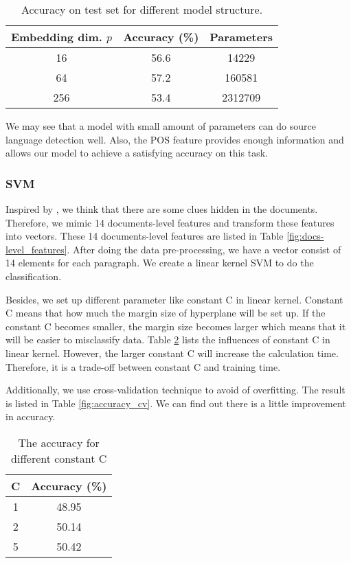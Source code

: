 \documentclass[twocolumn]{article}
\begin{document}
\begin{table}
    \begin{center}
        \begin{tabular}{c | c c}
            Embedding dim. $p$ & Accuracy (\%) & Parameters \\
            \hline
            16 & 56.6 & 14229 \\
            64 & 57.2 & 160581 \\
            256 & 53.4 & 2312709 \\
        \end{tabular}
        \caption{Accuracy on test set for different model structure.}
        \label{fig:accuracy_pos}
    \end{center}
\end{table}

We may see that a model with small amount of parameters can do source language detection well. Also, the POS feature provides enough information and allows our model to achieve a satisfying accuracy on this task.

\subsubsection*{SVM}
Inspired by \cite{literary}, we think that there are some clues hidden in the documents. Therefore, we mimic 14 documents-level features and transform these features into vectors. These 14 documents-level features are listed in Table \ref{fig:docs-level_features}. After doing the data pre-processing, we have a vector consist of 14 elements for each paragraph. We create a linear kernel SVM to do the classification.

Besides, we set up different parameter like constant C in linear kernel. Constant C means that how much the margin size of hyperplane will be set up. If the constant C becomes smaller, the margin size becomes larger which means that it will be easier to misclassify data. Table \ref{fig:accuracy_constant_c} lists the influences of constant C in linear kernel. However, the larger constant C will increase the calculation time. Therefore, it is a trade-off between constant C and training time.

Additionally, we use cross-validation technique to avoid of overfitting. The result is listed in Table \ref{fig:accuracy_cv}. We can find out there is a little improvement in accuracy.

\begin{table}
    \begin{center}     
        \begin{tabular}{c | c}
            C & Accuracy (\%) \\
            \hline
            1 & 48.95 \\
            2 & 50.14 \\
            5 & 50.42 \\
        \end{tabular}
        \caption{The accuracy for different constant C}
        \label{fig:accuracy_constant_c}
    \end{center}
\end{table}
\end{document}
